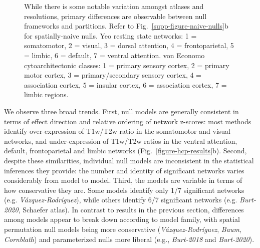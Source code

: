 \documentclass[12pt,aps,pra,reprint,showkeys]{revtex4-1}
\begin{document}
\begin{figure}[htp]
\begin{center}
{      While there is some notable variation amongst atlases and resolutions, primary differences are observable between null frameworks and partitions.
      Refer to Fig.~\ref{supp-figure-naive-nulls}b for spatially-naive nulls.
      Yeo resting state networks: 1 = somatomotor, 2 = visual, 3 = dorsal attention, 4 = frontoparietal, 5 = limbic, 6 = default, 7 = ventral attention.
      von Economo cytoarchitectonic classes: 1 = primary sensory cortex, 2 = primary motor cortex, 3 = primary/secondary sensory cortex, 4 = association cortex, 5 = insular cortex, 6 = association cortex, 7 = limbic regions.
    }
    \label{figure-network-results}
  \end{center}
\end{figure}

We observe three broad trends.
First, null models are generally consistent in terms of effect direction and relative ordering of network z-scores: most methods identify over-expression of T1w/T2w ratio in the somatomotor and visual networks, and under-expression of T1w/T2w ratios in the ventral attention, default, frontoparietal and limbic networks (Fig.~\ref{figure-hcp-results}b).
Second, despite these similarities, individual null models are inconsistent in the statistical inferences they provide: the number and identity of significant networks varies considerably from model to model.
Third, the models are variable in terms of how conservative they are.
Some models identify only 1/7 significant networks (e.g. \textit{V\'azquez-Rodr\'iguez}), while others identify 6/7 significant networks (e.g. \textit{Burt-2020}, Schaefer atlas).
In contrast to results in the previous section, differences among models appear to break down according to model family, with spatial permutation null models being more conservative (\textit{V\'azquez-Rodr\'iguez}, \textit{Baum}, \textit{Cornblath}) and parameterized nulls more liberal (e.g., \textit{Burt-2018} and \textit{Burt-2020}).
\end{document}
